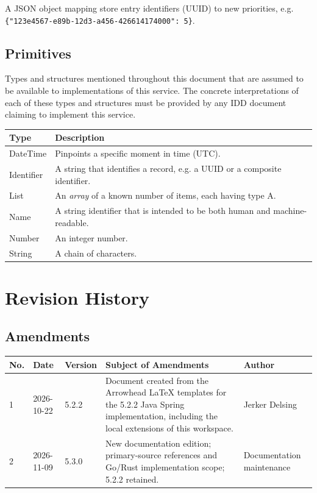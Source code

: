 \documentclass[a4paper]{arrowhead}
\newcommand{\pdef}[1]{{\textcolor{ArrowheadGrey}{#1\label{sec:model:primitives:#1}\label{sec:model:primitives:#1s}\label{sec:model:primitives:#1es}}}}
\begin{document}

A JSON object mapping store entry identifiers (UUID) to new priorities, e.g. \texttt{\{"123e4567-\allowbreak{}e89b-\allowbreak{}12d3-\allowbreak{}a456-\allowbreak{}426614174000": 5\}}.



\subsection{Primitives}
\label{sec:model:primitives}

Types and structures mentioned throughout this document that are assumed to be available to implementations of this service.
The concrete interpretations of each of these types and structures must be provided by any IDD document claiming to implement this service.

\noindent\begin{tabularx}{\textwidth}{| p{4.6cm} | X |} \hline
\rowcolor{gray!33} Type & Description \\ \hline
\pdef{DateTime} & Pinpoints a specific moment in time (UTC). \\ \hline
\pdef{Identifier} & A string that identifies a record, e.g. a UUID or a composite identifier. \\ \hline
\pdef{List} & An \textit{array} of a known number of items, each having type A. \\ \hline
\pdef{Name} & A string identifier that is intended to be both human and machine-readable. \\ \hline
\pdef{Number} & An integer number. \\ \hline
\pdef{String} & A chain of characters. \\ \hline
\end{tabularx}

\newpage




\newpage

\section{Revision History}
\subsection{Amendments}

\noindent\begin{tabularx}{\textwidth}{| p{1cm} | p{3cm} | p{2cm} | X | p{4cm} |} \hline
\rowcolor{gray!33} No. & Date & Version & Subject of Amendments & Author \\ \hline

1 & 2026-10-22 & 5.2.2 & Document created from the Arrowhead LaTeX templates for the 5.2.2 Java Spring implementation, including the local extensions of this workspace. & Jerker Delsing \\ \hline
2 & 2026-11-09 & 5.3.0 & New documentation edition; primary-source references and Go/Rust implementation scope; 5.2.2 retained. & Documentation maintenance \\ \hline
\end{tabularx}
\end{document}

